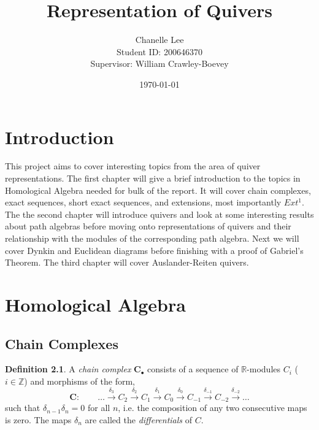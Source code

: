 \documentclass[11.5pt, twoside, a4paper, titlepage]{report}
\theoremstyle{definition}
\newtheorem{mydef}{Definition}[section]
\theoremstyle{plain}
\begin{document}
\title{Representation of Quivers}
\author{Chanelle Lee \\Student ID: 200646370\\Supervisor: William Crawley-Boevey}
\date{\today}
\maketitle


\tableofcontents

\chapter{Introduction}

This project aims to cover interesting topics from the area of quiver representations. The first chapter will give a brief introduction to the topics in Homological Algebra needed for bulk of the report. It will cover chain complexes, exact sequences, short exact sequences, and extensions, most importantly $Ext^1$. The the second chapter will introduce quivers and look at some interesting results about path algebras before moving onto representations of quivers and their relationship with the modules of the corresponding path algebra. Next we will cover Dynkin and Euclidean diagrams before finishing with a proof of Gabriel's Theorem. The third chapter will cover Auslander-Reiten quivers.

\chapter{Homological Algebra}
\section{Chain Complexes}

\begin{mydef}
A \emph{chain complex} $\mathbf{C}_{\bullet}$ consists of a sequence of $\mathbb{R}$-modules $C_i$ ($i \in \mathbb{Z}$) and morphisms of the form,
\begin{equation*}
\mathbf{C}: \qquad \dots \xrightarrow{\delta_{3}} C_2 \xrightarrow{\delta_{2}} C_1 \xrightarrow{\delta_{1 }} C_0 \xrightarrow{\delta_0} C_{-1} \xrightarrow{\delta_{-1}} C_{-2} \xrightarrow{\delta_{-2}}\dots
\end{equation*}
such that $\delta_{n-1}\delta_{n}=0$ for all $n$, i.e. the composition of any two consecutive maps is zero. The maps $\delta_n$ are called the \emph{differentials} of $C$.
\end{mydef}
\end{document}
